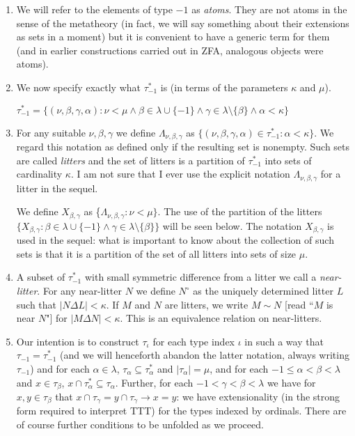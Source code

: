 \documentclass[12pt]{article}
\begin{document}
\begin{enumerate}
\item We will refer to the elements of type $-1$ as {\em atoms\/}.  They are not atoms in the sense of the metatheory (in fact, we will say something about their extensions as sets in a moment) but it is convenient to have a generic term for them (and in earlier constructions carried out in ZFA, analogous objects were atoms).

\item We now specify exactly what $\tau^*_{-1}$ is (in terms of the parameters $\kappa$ and $\mu$).

$\tau^*_{-1}= \{(\nu,\beta,\gamma,\alpha):\nu<\mu \wedge  \beta \in \lambda\cup \{-1\} \wedge \gamma \in \lambda \setminus \{\beta\}\wedge \alpha<\kappa\}$

\item For any suitable $\nu, \beta, \gamma$ we define $\Lambda_{\nu,\beta,\gamma}$ as $\{(\nu,\beta,\gamma,\alpha)\in \tau^*_{-1}:\alpha<\kappa\}$.  We regard this notation as defined
only if the resulting set is nonempty.  Such sets are called {\em litters} and the set of litters is a partition of $\tau^*_{-1}$ into sets of cardinality $\kappa$.  I am not sure that I ever use the explicit notation $\Lambda_{\nu,\beta,\gamma}$ for a litter in the sequel.

We define $X_{\beta,\gamma}$ as \{$\Lambda_{\nu,\beta,\gamma}:\nu<\mu\}$.  The use of the partition of the litters $\{X_{\beta,\gamma}:\beta \in \lambda\cup \{-1\} \wedge \gamma \in \lambda \setminus \{\beta\}\}$ will be seen below.  The notation $X_{\beta,\gamma}$ is used in the sequel:  what is important to know about
the collection of such sets is that it is a partition of the set of all litters into sets of size $\mu$.

\item A subset of $\tau^*_{-1}$ with small symmetric difference from a litter we call a {\em near-litter\/}.  For any near-litter $N$ we define $N^\circ$ as the uniquely determined litter $L$
such that $|N \Delta L|<\kappa$.  If $M$ and $N$ are litters, we write $M \sim N$ [read ``$M$ is near $N$"] for $|M \Delta N| < \kappa$.  This is an equivalence relation on near-litters.

\item Our intention is to construct $\tau_\iota$ for each type index $\iota$ in such a way that $\tau_{-1} = \tau^*_{-1}$ (and we will henceforth abandon the latter notation, always writing $\tau_{-1}$)
and for each $\alpha \in \lambda$, $\tau_\alpha \subseteq \tau^*_\alpha$ and $|\tau_\alpha| = \mu$, and for each $-1 \leq \alpha < \beta <\lambda$ and $x \in \tau_\beta$,
$x \cap \tau^*_\alpha\subseteq \tau_\alpha$.   Further, for each $-1<\gamma<\beta<\lambda$ we
have for $x,y \in \tau_\beta$ that $x \cap \tau_\gamma = y \cap \tau_\gamma \rightarrow x=y$:  we have extensionality (in the strong form required to interpret TTT)  for the types indexed by ordinals.  There are of course further conditions to be unfolded as we proceed.


\end{enumerate}
\end{document}
